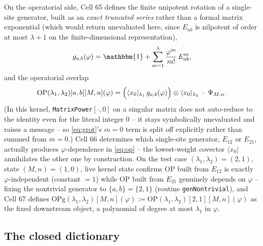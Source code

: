 \documentclass[11pt]{article}
\begin{document}
On the operatorial side, Cell 65 defines the finite unipotent rotation of a single-site generator,
built as an \emph{exact truncated series} rather than a formal matrix exponential (which would
return unevaluated here, since $E_{ab}$ is nilpotent of order at most $\lambda+1$ on the
finite-dimensional representation),
\begin{equation}
  g_{a,b}(\varphi) = \mathbbm{1} + \sum_{m=1}^{\lambda}\frac{\varphi^m}{m!}\,E_{ab}^m,
  \label{eq:grot}
\end{equation}
and the operatorial overlap
\begin{equation}
  \mathrm{OP}(\lambda_1,\lambda_2)[a,b][M,n](\varphi) = \Bigl(\langle x_0|_{\lambda_1}\,g_{a,b}(\varphi)\Bigr)\otimes\langle x_0|_{\lambda_2}
  \;\cdot\;\Psi_{M,n}.
  \label{eq:op}
\end{equation}
(In this kernel, \texttt{MatrixPower}$[\cdot,0]$ on a singular matrix does not auto-reduce to the
identity even for the literal integer $0$ -- it stays symbolically unevaluated and raises a
message -- so \eqref{eq:grot}'s $m=0$ term is split off explicitly rather than summed from $m=0$.)
Cell 66 determines which single-site generator, $E_{12}$ or $E_{21}$, actually produces
$\varphi$-dependence in \eqref{eq:op} -- the lowest-weight covector $\langle x_0|$ annihilates the
other one by construction. On the test case $(\lambda_1,\lambda_2)=(2,1)$, state $(M,n)=(1,0)$,
live kernel state confirms $\mathrm{OP}$ built from $E_{12}$ is exactly $\varphi$-independent
(constant $=1$) while $\mathrm{OP}$ built from $E_{21}$ genuinely depends on $\varphi$ -- fixing the
nontrivial generator to $\{a,b\}=\{2,1\}$ (routine \texttt{genNontrivial}), and Cell 67 defines
$\mathrm{OPg}(\lambda_1,\lambda_2)[M,n](\varphi) := \mathrm{OP}(\lambda_1,\lambda_2)[2,1][M,n](\varphi)$
as the fixed downstream object, a polynomial of degree at most $\lambda_1$ in $\varphi$.

\subsection{The closed dictionary}
\end{document}
